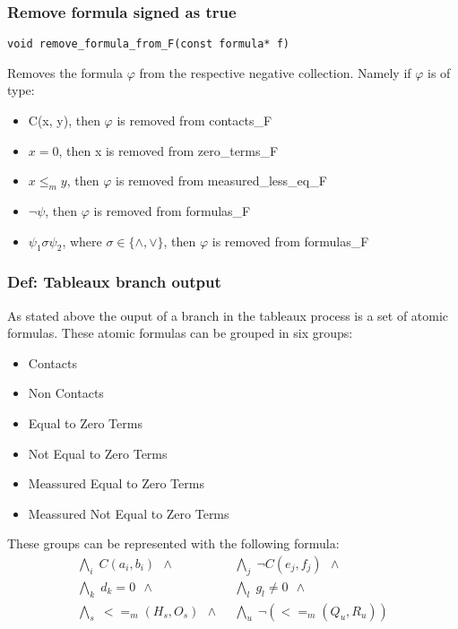 \documentclass{article}
\begin{document}
			\subsubsection*{Remove formula signed as true}
				\begin{lstlisting}
void remove_formula_from_F(const formula* f)
				\end{lstlisting}
				Removes the formula $\varphi$ from the respective negative collection.
				Namely if $\varphi$ is of type:
				\begin{itemize}
					\item C(x, y), then $\varphi$ is removed from contacts\_F
					\item $x = 0$, then x is removed from zero\_terms\_F
					\item $x \le_m y$, then $\varphi$ is removed from measured\_less\_eq\_F
					\item $\neg \psi$, then $\varphi$ is removed from formulas\_F
					\item $\psi_1 \sigma \psi_2$, where $\sigma \in \{\wedge, \vee\}$, then $\varphi$ is removed from formulas\_F
				\end{itemize}
			\subsubsection{Def: Tableaux branch output}
			\label{tableaux:branch:output}
				As stated above the ouput of a branch in the tableaux process is a set of atomic formulas.
				These atomic formulas can be grouped in six groups:
				\begin{itemize}
					\item Contacts
					\item Non Contacts
					\item Equal to Zero Terms
					\item Not Equal to Zero Terms
					\item Meassured Equal to Zero Terms
					\item Meassured Not Equal to Zero Terms
				\end{itemize}
				These groups can be represented with the following formula:
				\begin{align*}
					\bigwedge\nolimits_{i} \; C(a_i, b_i) \:\: \wedge \:\: &
					\bigwedge\nolimits_{j} \; \neg C(e_j, f_j) \:\: \wedge \:\: \\
					\bigwedge\nolimits_{k} \; d_k = 0 \:\: \wedge \:\: &
					\bigwedge\nolimits_{l} \; g_l \neq 0 \:\: \wedge \:\: \\
					\bigwedge\nolimits_{s} \; <=_m(H_s, O_s) \:\: \wedge \:\: &
					\bigwedge\nolimits_{u} \; \neg (<=_m(Q_u, R_u) )
				\end{align*}
\end{document}
